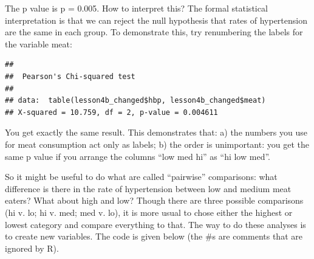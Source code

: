 \documentclass[]{book}
\newenvironment{Shaded}{\begin{snugshade}}{\end{snugshade}}
\newcommand{\DataTypeTok}[1]{\textcolor[rgb]{0.13,0.29,0.53}{#1}}
\newcommand{\DecValTok}[1]{\textcolor[rgb]{0.00,0.00,0.81}{#1}}
\newcommand{\FloatTok}[1]{\textcolor[rgb]{0.00,0.00,0.81}{#1}}
\newcommand{\KeywordTok}[1]{\textcolor[rgb]{0.13,0.29,0.53}{\textbf{#1}}}
\newcommand{\NormalTok}[1]{#1}
\newcommand{\OperatorTok}[1]{\textcolor[rgb]{0.81,0.36,0.00}{\textbf{#1}}}
\newcommand{\OtherTok}[1]{\textcolor[rgb]{0.56,0.35,0.01}{#1}}
\newcommand{\StringTok}[1]{\textcolor[rgb]{0.31,0.60,0.02}{#1}}
\begin{document}
The p value is p = 0.005. How to interpret this? The formal statistical interpretation is that we can reject the null hypothesis that rates of hypertension are the same in each group. To demonstrate this, try renumbering the labels for the variable meat:

\begin{Shaded}
\end{Shaded}

\begin{verbatim}
## 
##  Pearson's Chi-squared test
## 
## data:  table(lesson4b_changed$hbp, lesson4b_changed$meat)
## X-squared = 10.759, df = 2, p-value = 0.004611
\end{verbatim}

You get exactly the same result. This demonstrates that: a) the numbers you use for meat consumption act only as labels; b) the order is unimportant: you get the same p value if you arrange the columns ``low med hi'' as ``hi low med''.

So it might be useful to do what are called ``pairwise'' comparisons: what difference is there in the rate of hypertension between low and medium meat eaters? What about high and low? Though there are three possible comparisons (hi v. lo; hi v. med; med v. lo), it is more usual to chose either the highest or lowest category and compare everything to that. The way to do these analyses is to create new variables. The code is given below (the \#s are comments that are ignored by R).
\end{document}
